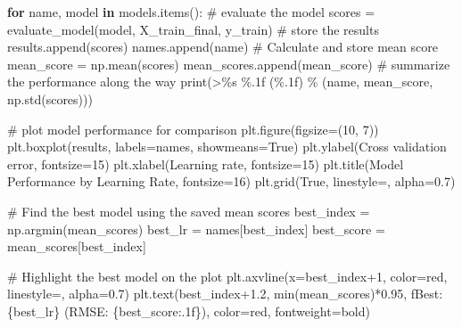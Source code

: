 \documentclass[
  letterpaper,
  DIV=11,
  numbers=noendperiod]{scrreprt}
\newenvironment{Shaded}{\begin{snugshade}}{\end{snugshade}}
\newcommand{\BuiltInTok}[1]{\textcolor[rgb]{0.00,0.23,0.31}{#1}}
\newcommand{\CommentTok}[1]{\textcolor[rgb]{0.37,0.37,0.37}{#1}}
\newcommand{\ControlFlowTok}[1]{\textcolor[rgb]{0.00,0.23,0.31}{\textbf{#1}}}
\newcommand{\DecValTok}[1]{\textcolor[rgb]{0.68,0.00,0.00}{#1}}
\newcommand{\FloatTok}[1]{\textcolor[rgb]{0.68,0.00,0.00}{#1}}
\newcommand{\KeywordTok}[1]{\textcolor[rgb]{0.00,0.23,0.31}{\textbf{#1}}}
\newcommand{\NormalTok}[1]{\textcolor[rgb]{0.00,0.23,0.31}{#1}}
\newcommand{\OperatorTok}[1]{\textcolor[rgb]{0.37,0.37,0.37}{#1}}
\newcommand{\SpecialCharTok}[1]{\textcolor[rgb]{0.37,0.37,0.37}{#1}}
\newcommand{\SpecialStringTok}[1]{\textcolor[rgb]{0.13,0.47,0.30}{#1}}
\newcommand{\StringTok}[1]{\textcolor[rgb]{0.13,0.47,0.30}{#1}}
\newcommand{\VariableTok}[1]{\textcolor[rgb]{0.07,0.07,0.07}{#1}}
\begin{document}
\begin{Shaded}
\begin{Highlighting}[]
\ControlFlowTok{for}\NormalTok{ name, model }\KeywordTok{in}\NormalTok{ models.items():}
    \CommentTok{\# evaluate the model}
\NormalTok{    scores }\OperatorTok{=}\NormalTok{ evaluate\_model(model, X\_train\_final, y\_train)}
    \CommentTok{\# store the results}
\NormalTok{    results.append(scores)}
\NormalTok{    names.append(name)}
    \CommentTok{\# Calculate and store mean score}
\NormalTok{    mean\_score }\OperatorTok{=}\NormalTok{ np.mean(scores)}
\NormalTok{    mean\_scores.append(mean\_score)}
    \CommentTok{\# summarize the performance along the way}
    \BuiltInTok{print}\NormalTok{(}\StringTok{\textquotesingle{}\textgreater{}}\SpecialCharTok{\%s}\StringTok{ }\SpecialCharTok{\%.1f}\StringTok{ (}\SpecialCharTok{\%.1f}\StringTok{)\textquotesingle{}} \OperatorTok{\%}\NormalTok{ (name, mean\_score, np.std(scores)))}

\CommentTok{\# plot model performance for comparison}
\NormalTok{plt.figure(figsize}\OperatorTok{=}\NormalTok{(}\DecValTok{10}\NormalTok{, }\DecValTok{7}\NormalTok{))}
\NormalTok{plt.boxplot(results, labels}\OperatorTok{=}\NormalTok{names, showmeans}\OperatorTok{=}\VariableTok{True}\NormalTok{)}
\NormalTok{plt.ylabel(}\StringTok{\textquotesingle{}Cross validation error\textquotesingle{}}\NormalTok{, fontsize}\OperatorTok{=}\DecValTok{15}\NormalTok{)}
\NormalTok{plt.xlabel(}\StringTok{\textquotesingle{}Learning rate\textquotesingle{}}\NormalTok{, fontsize}\OperatorTok{=}\DecValTok{15}\NormalTok{)}
\NormalTok{plt.title(}\StringTok{\textquotesingle{}Model Performance by Learning Rate\textquotesingle{}}\NormalTok{, fontsize}\OperatorTok{=}\DecValTok{16}\NormalTok{)}
\NormalTok{plt.grid(}\VariableTok{True}\NormalTok{, linestyle}\OperatorTok{=}\StringTok{\textquotesingle{}{-}{-}\textquotesingle{}}\NormalTok{, alpha}\OperatorTok{=}\FloatTok{0.7}\NormalTok{)}

\CommentTok{\# Find the best model using the saved mean scores}
\NormalTok{best\_index }\OperatorTok{=}\NormalTok{ np.argmin(mean\_scores)}
\NormalTok{best\_lr }\OperatorTok{=}\NormalTok{ names[best\_index]}
\NormalTok{best\_score }\OperatorTok{=}\NormalTok{ mean\_scores[best\_index]}

\CommentTok{\# Highlight the best model on the plot}
\NormalTok{plt.axvline(x}\OperatorTok{=}\NormalTok{best\_index}\OperatorTok{+}\DecValTok{1}\NormalTok{, color}\OperatorTok{=}\StringTok{\textquotesingle{}red\textquotesingle{}}\NormalTok{, linestyle}\OperatorTok{=}\StringTok{\textquotesingle{}{-}{-}\textquotesingle{}}\NormalTok{, alpha}\OperatorTok{=}\FloatTok{0.7}\NormalTok{)}
\NormalTok{plt.text(best\_index}\OperatorTok{+}\FloatTok{1.2}\NormalTok{, }\BuiltInTok{min}\NormalTok{(mean\_scores)}\OperatorTok{*}\FloatTok{0.95}\NormalTok{, }
         \SpecialStringTok{f\textquotesingle{}Best: }\SpecialCharTok{\{}\NormalTok{best\_lr}\SpecialCharTok{\}}\SpecialStringTok{ (RMSE: }\SpecialCharTok{\{}\NormalTok{best\_score}\SpecialCharTok{:.1f\}}\SpecialStringTok{)\textquotesingle{}}\NormalTok{, }
\NormalTok{         color}\OperatorTok{=}\StringTok{\textquotesingle{}red\textquotesingle{}}\NormalTok{, fontweight}\OperatorTok{=}\StringTok{\textquotesingle{}bold\textquotesingle{}}\NormalTok{)}


\end{Highlighting}
\end{Shaded}
\end{document}
